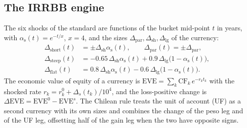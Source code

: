\subsection{The IRRBB engine}

The six shocks of the standard are functions of the bucket mid-point $t$ in years, with $\alpha_{\mathrm{s}}(t)=e^{-t/x}$, $x=4$, and the sizes $\Delta_{\mathrm{par}},\Delta_{\mathrm{sh}},\Delta_{\mathrm{lg}}$ of the currency:
\begin{align}
  \Delta_{\mathrm{short}}(t)&=\pm\Delta_{\mathrm{sh}}\alpha_{\mathrm{s}}(t),\qquad \Delta_{\mathrm{par}}(t)=\pm\Delta_{\mathrm{par}},\nonumber\\
  \Delta_{\mathrm{steep}}(t)&=-0.65\,\Delta_{\mathrm{sh}}\alpha_{\mathrm{s}}(t)+0.9\,\Delta_{\mathrm{lg}}\bigl(1-\alpha_{\mathrm{s}}(t)\bigr),\label{eq:shocks}\\
  \Delta_{\mathrm{flat}}(t)&=0.8\,\Delta_{\mathrm{sh}}\alpha_{\mathrm{s}}(t)-0.6\,\Delta_{\mathrm{lg}}\bigl(1-\alpha_{\mathrm{s}}(t)\bigr).\nonumber
\end{align}
The economic value of equity of a currency is $\mathrm{EVE}=\sum_k\mathrm{CF}_k\,e^{-r_kt_k}$ with the shocked rate $r_k=r_k^0+\Delta_s(t_k)/10^4$, and the loss-positive change is $\Delta\mathrm{EVE}=\mathrm{EVE}^0-\mathrm{EVE}^s$. The Chilean rule treats the unit of account (UF) as a second currency with its own sizes and combines the change of the peso leg and of the UF leg, offsetting half of the gain leg when the two have opposite signs.

